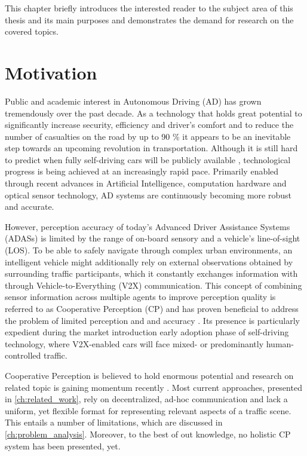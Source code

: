 This chapter briefly introduces the interested reader to the subject area of this thesis and its main purposes and demonstrates the demand for research on the covered topics. 

\section{Motivation}
\label{sec:motivation}
Public and academic interest in Autonomous Driving (AD) has grown tremendously over the past decade. As a technology that holds great potential to significantly increase security, efficiency and driver's comfort and to reduce the number of casualties on the road by up to 90 \% \cite{Markwalter2017} it appears to be an inevitable step towards an upcoming revolution in transportation.
Although it is still hard to predict when fully self-driving cars will be publicly available \cite{Frost&SulivanConsulting2018}, technological progress is being achieved at an increasingly rapid pace. Primarily enabled through recent advances in Artificial Intelligence, computation hardware and optical sensor technology, AD systems are continuously becoming more robust and accurate.
\par
\bigskip

However, perception accuracy of today's Advanced Driver Assistance Systems (ADASs) is limited by the range of on-board sensory and a vehicle's line-of-sight (LOS). To be able to safely navigate through complex urban environments, an intelligent vehicle might additionally rely on external observations obtained by surrounding traffic participants, which it constantly exchanges information with through Vehicle-to-Everything (V2X) communication. This concept of combining sensor information across multiple agents to improve perception quality is referred to as Cooperative Perception (CP) and has proven beneficial to address the problem of limited perception and and accuracy \cite{Chen2019, Hohm2019}. Its presence is particularly expedient during the market introduction early adoption phase of self-driving technology, where V2X-enabled cars will face mixed- or predominantly human-controlled traffic.  
\par
\bigskip

Cooperative Perception is believed to hold enormous potential \cite{Gunther2015} and research on related topic is gaining momentum recently \cite{Chen2019, Thandavarayan2019, Calvo2017, BMWGroup2019}. Most current approaches, presented in \autoref{ch:related_work}, rely on decentralized, ad-hoc communication and lack a uniform, yet flexible format for representing relevant aspects of a traffic scene. This entails a number of limitations, which are discussed in \autoref{ch:problem_analysis}. Moreover, to the best of out knowledge, no holistic CP system has been presented, yet. 
\par
\bigskip

